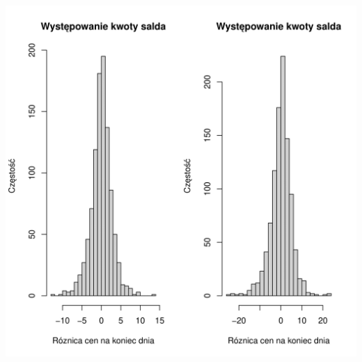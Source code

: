 \documentclass{beamer}
\begin{document}
\begin{frame}
  \centering \includegraphics[scale=0.55]{images/histogram.png} 
\end{frame}
\end{document}
